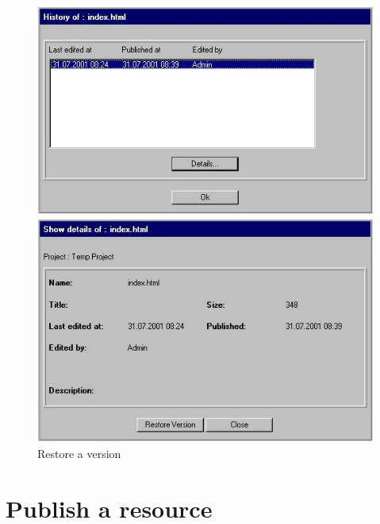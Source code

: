 \begin{figure}[hbt]
\begin{minipage}[b]{0.499\linewidth}
\begin{center}
\includegraphics[width=\sgw]
                   {pics/newProject/restore01}
\end{center}
\end{minipage}
\begin{minipage}[b]{0.499\linewidth}
\begin{center}
\includegraphics[width=\sgw]
                   {pics/newProject/restore02}
\end{center}
\end{minipage}
\caption[Restore a version]
           {Restore a version}
\label{restorever}
\end{figure}


\newpage
\section{Publish a resource}

